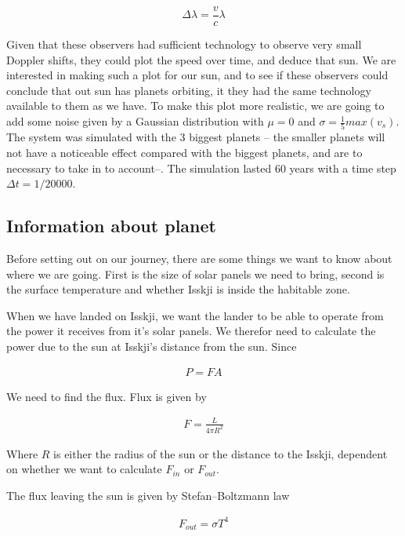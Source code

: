 \documentclass[a4paper, 10pt]{article}
\begin{document}
\begin{equation}
\Delta \lambda = \frac{v}{c}\lambda
\end{equation}

Given that these observers had sufficient technology to observe very small Doppler shifts, they could plot the speed over time, and deduce that sun. We are interested in making such a plot for our sun, and to see if these observers could conclude that out sun has planets orbiting, it they had the same technology available to them as we have. To make this plot more realistic, we are going to add some noise given by a Gaussian distribution with $\mu = 0$ and $\sigma = \frac{1}{5} max(v_s)$.\\

The system was simulated with the 3 biggest planets -- the smaller planets will not have a noticeable effect compared with the biggest planets, and are to necessary to take in to account--. The simulation lasted 60 years with a time step $\Delta t = 1/20000$.

\subsection{Information about planet}
Before setting out on our journey, there are some things we want to know about where we are going. First is the size of solar panels we need to bring, second is the surface temperature and whether Isskji is inside the habitable zone.

When we have landed on Isskji, we want the lander to be able to operate from the power it receives from it's solar panels. We therefor need to calculate the power due to the sun at Isskji's distance from the sun. Since 

\begin{align}
P = FA
\end{align}

We need to find the flux. Flux is given by

\begin{align}
F = \frac{L}{4\pi R^2}
\end{align}

Where $R$ is either the radius of the sun or the distance to the Isskji, dependent on whether we want to calculate $F_{in}$ or $F_{out}$.

The flux leaving the sun is given by Stefan–Boltzmann law

\begin{align*}
F_{out} = \sigma T^4
\end{align*}
\end{document}
